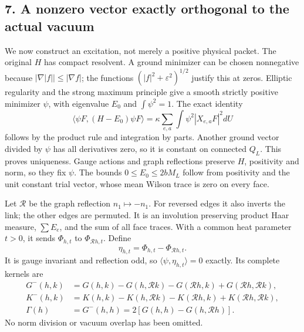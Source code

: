 \documentclass[11pt]{article}
\begin{document}
\subsection*{7. A nonzero vector exactly orthogonal to the actual vacuum}

We now construct an excitation, not merely a positive physical packet.
The original \(H\) has compact resolvent. A ground minimizer can be
chosen nonnegative because \(|\nabla|f||\le|\nabla f|\); the functions
\((|f|^2+\varepsilon^2)^{1/2}\) justify this at zeros. Elliptic regularity
and the strong maximum principle give a smooth strictly positive minimizer
\(\psi\), with eigenvalue \(E_0\) and \(\int\psi^2=1\).
The exact identity
\[
 \langle\psi F,(H-E_0)\psi F\rangle
 =\kappa\sum_{e,a}\int\psi^2|X_{e,a}F|^2dU
 \tag{PK37}
\]
follows by the product rule and integration by parts. Another ground
vector divided by \(\psi\) has all derivatives zero, so it is constant
on connected \(Q_L\). This proves uniqueness. Gauge actions and graph
reflections preserve \(H\), positivity and norm, so they fix \(\psi\).
The bounds \(0\le E_0\le2bM_L\) follow from positivity and the unit
constant trial vector, whose mean Wilson trace is zero on every face.

Let \(\mathcal R\) be the graph reflection \(n_1\mapsto-n_1\).
For reversed edges it also inverts the link; the other edges are permuted.
It is an involution preserving product Haar measure, \(\sum E_e\),
and the sum of all face traces. With a common heat parameter \(t>0\),
it sends \(\Phi_{h,t}\) to \(\Phi_{\mathcal Rh,t}\). Define
\[
 \eta_{h,t}=\Phi_{h,t}-\Phi_{\mathcal Rh,t}.
 \tag{PK38}
\]
It is gauge invariant and reflection odd, so
\(\langle\psi,\eta_{h,t}\rangle=0\) exactly. Its complete kernels are
\[
 \begin{split}
 G^- (h,k)&=G(h,k)-G(h,\mathcal Rk)-G(\mathcal Rh,k)+G(\mathcal Rh,\mathcal Rk),\\
 K^- (h,k)&=K(h,k)-K(h,\mathcal Rk)-K(\mathcal Rh,k)+K(\mathcal Rh,\mathcal Rk),\\
 \Gamma(h)&=G^-(h,h)=2[G(h,h)-G(h,\mathcal Rh)].
 \end{split}\tag{PK39}
\]
No norm division or vacuum overlap has been omitted.
\end{document}
